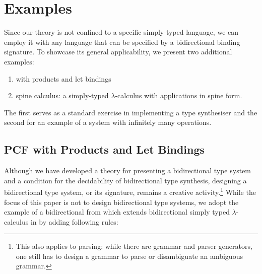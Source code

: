 
\section{Examples}\label{sec:example}
Since our theory is not confined to a specific simply-typed language, we can employ it with any language that can be specified by a bidirectional binding signature.
To showcase its general applicability, we present two additional examples:
\begin{enumerate}
\item \PCF with products and let bindings
\item spine calculus: a simply-typed $\lambda$-calculus with applications in spine form.
\end{enumerate}
The first serves as a standard exercise in implementing a type synthesiser and the second for an example of a system with infinitely many operations.

\subsection{PCF with Products and Let Bindings}\label{subsec:PCF}
Although we have developed a theory for presenting a bidirectional type system and a condition for the decidability of bidirectional type synthesis, designing a bidirectional type system, or its signature, remains a creative activity.\footnote{This also applies to parsing: while there are grammar and parser generators, one still has to design a grammar to parse or disambiguate an ambiguous grammar.}
While the focus of this paper is not to design bidirectional type systems, we adopt the example of a bidirectional \PCF from \citet{Wadler2022} which extends bidirectional simply typed $\lambda$-calculus in  by adding following rules:

\bgroup
\small
  \centering
\egroup


